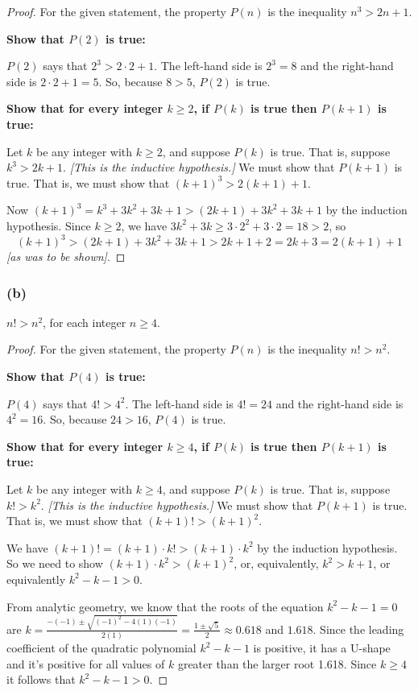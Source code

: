 \documentclass[14pt]{extarticle}
\newcommand{\dps}{\displaystyle}
\begin{document}
\begin{proof}
    For the given statement, the property $P(n)$ is the inequality $n^3 > 2n + 1$.

        {\bf Show that $P(2)$ is true:}

    $P(2)$ says that $2^3 > 2\cdot2 + 1$. The left-hand side is $2^3 = 8$ and the right-hand side is $2 \cdot 2 + 1 = 5$. So, because $8 > 5$, $P(2)$ is true.

        {\bf Show that for every integer $k \geq 2$, if $P(k)$ is true then $P(k + 1)$ is true:}

    Let $k$ be any integer with $k \geq 2$, and suppose $P(k)$ is true. That is, suppose $k^3 > 2k + 1$. {\it [This is the inductive hypothesis.]} We must show that $P(k + 1)$ is true. That is, we must show that $(k + 1)^3 > 2(k + 1) + 1$.

    Now $(k + 1)^3 = k^3 + 3k^2 + 3k + 1 > (2k + 1) + 3k^2 + 3k + 1$ by the induction hypothesis. Since $k \geq 2$, we have $3k^2 + 3k \geq 3 \cdot 2^2 + 3 \cdot 2 = 18 > 2$, so
    \[
        (k + 1)^3 > (2k + 1) + 3k^2 + 3k + 1 > 2k + 1 + 2 = 2k + 3 = 2(k + 1) + 1
    \]
    {\it [as was to be shown]}.
\end{proof}

\subsubsection{(b)}
$n! > n^2$, for each integer $n \geq 4$.

\begin{proof}
    For the given statement, the property $P(n)$ is the inequality $n! > n^2$.

        {\bf Show that $P(4)$ is true:}

    $P(4)$ says that $4! > 4^2$. The left-hand side is $4! = 24$ and the right-hand side is $4^2 = 16$. So, because $24 > 16$, $P(4)$ is true.

        {\bf Show that for every integer $k \geq 4$, if $P(k)$ is true then $P(k + 1)$ is true:}

    Let $k$ be any integer with $k \geq 4$, and suppose $P(k)$ is true. That is, suppose $k! > k^2$. {\it [This is the inductive hypothesis.]} We must show that $P(k + 1)$ is true. That is, we must show that $(k + 1)! > (k + 1)^2$.

    We have $(k + 1)! = (k + 1) \cdot k! > (k + 1) \cdot k^2$ by the induction hypothesis. So we need to show $(k + 1) \cdot k^2 > (k + 1)^2$, or, equivalently, $k^2 > k+1$, or equivalently $k^2 - k - 1 > 0$.

    From analytic geometry, we know that the roots of the equation $k^2 - k - 1 = 0$ are $k = \dps \frac{-(-1) \pm \sqrt{(-1)^2 - 4(1)(-1)}}{2(1)} = \frac{1 \pm \sqrt{5}}{2} \approx 0.618$ and $1.618$. Since the leading coefficient of the quadratic polynomial $k^2 - k - 1$ is positive, it has a U-shape and it's positive for all values of $k$ greater than the larger root 1.618. Since $k \geq 4$ it follows that $k^2 - k - 1 > 0$.
\end{proof}
\end{document}
